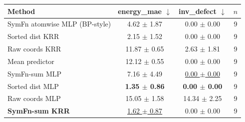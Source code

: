 \begin{tabular}{lccc}
\toprule
Method & energy\_mae $\downarrow$ & inv\_defect $\downarrow$ & $n$ \\
\midrule
SymFn atomwise MLP (BP-style) & 4.62 $\pm$ 1.87 & 0.00 $\pm$ 0.00 & 9 \\
Sorted dist KRR & 2.15 $\pm$ 1.52 & 0.00 $\pm$ 0.00 & 9 \\
Raw coords KRR & 11.87 $\pm$ 0.65 & 2.63 $\pm$ 1.81 & 9 \\
Mean predictor & 12.12 $\pm$ 0.55 & 0.00 $\pm$ 0.00 & 9 \\
SymFn-sum MLP & 7.16 $\pm$ 4.49 & \underline{0.00 $\pm$ 0.00} & 9 \\
Sorted dist MLP & \textbf{1.35 $\pm$ 0.86} & \textbf{0.00 $\pm$ 0.00} & 9 \\
Raw coords MLP & 15.05 $\pm$ 1.58 & 14.34 $\pm$ 2.25 & 9 \\
\textbf{SymFn-sum KRR} & \underline{1.62 $\pm$ 0.87} & 0.00 $\pm$ 0.00 & 9 \\
\bottomrule
\end{tabular}
